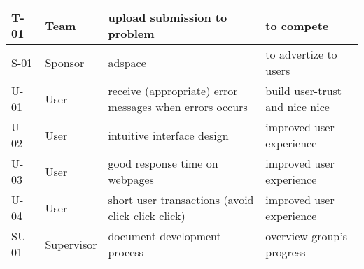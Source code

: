 \begin{longtable}{|p{}|p{}|p{}|p{}|}
\hline
T-01&Team&upload submission to problem&to compete\\
\hline
S-01&Sponsor&adspace&to advertize to users\\
\hline
U-01&User&receive (appropriate) error messages when errors occurs&build user-trust and nice nice\\
\hline
U-02&User&intuitive interface design&improved user experience\\
\hline
U-03&User&good response time on webpages&improved user experience\\
\hline
U-04&User&short user transactions (avoid click click click)&improved user experience\\
\hline
SU-01&Supervisor&document development process&overview group's progress\\
\hline
\end{longtable}
